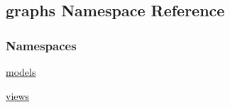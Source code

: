 \hypertarget{namespacegraphs}{}\subsection{graphs Namespace Reference}
\label{namespacegraphs}
\subsubsection*{Namespaces}
\begin{DoxyCompactItemize}
\item 
 \hyperlink{namespacegraphs_1_1models}{models}
\item 
 \hyperlink{namespacegraphs_1_1views}{views}
\end{DoxyCompactItemize}
